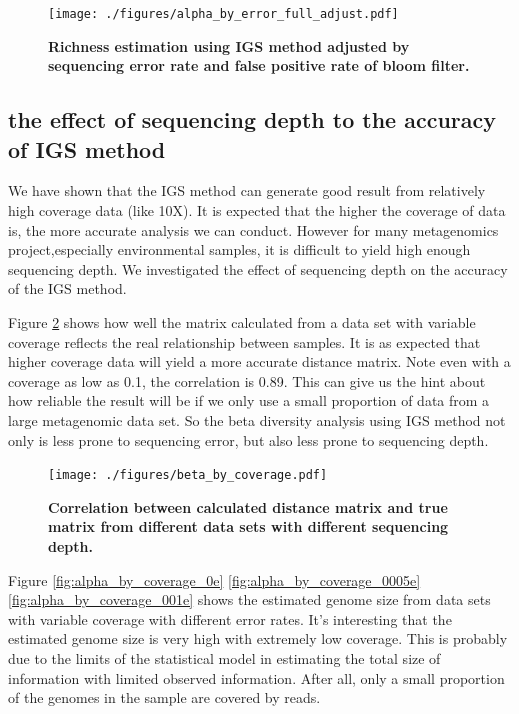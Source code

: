 \begin{figure}[!ht]
 \centerline{\texttt{[image: ./figures/alpha\_by\_error\_full\_adjust.pdf]}}
\caption{\bf Richness estimation using IGS method adjusted by sequencing error
rate and false positive rate of bloom filter.}
\label{fig:IGS_richness_adjustment}
\end{figure}


\subsection{the effect of sequencing depth to the accuracy of IGS method}


We have shown that the IGS method can generate good result from relatively
high coverage data (like 10X). It is expected that the higher the coverage
of data is, the more accurate analysis we can conduct. However for many 
metagenomics project,especially environmental samples, it is difficult
to yield high enough sequencing depth. We investigated the effect of 
sequencing depth on the accuracy of the IGS method.


Figure \ref{fig:IGS_correlation_coverage} shows how well the matrix 
calculated from a data set with variable coverage 
reflects the real relationship between samples. It is as expected that 
higher coverage data will yield a more accurate distance matrix.
Note even with a coverage as low as 0.1, the correlation is 0.89. 
This can give us the hint about how reliable the result will be if 
we only use a small proportion of data from a large metagenomic data set.
So the beta diversity analysis using IGS method not only is less prone to
sequencing error, but also less prone to sequencing depth.


\begin{figure}[!ht]
 \centerline{\texttt{[image: ./figures/beta\_by\_coverage.pdf]}}
\caption{\bf Correlation between calculated distance matrix and true matrix
from different data sets with different sequencing depth.}
\label{fig:IGS_correlation_coverage}
\end{figure}



Figure \ref{fig:alpha_by_coverage_0e} \ref{fig:alpha_by_coverage_0005e} \ref{fig:alpha_by_coverage_001e} 
shows the estimated genome size 
from data sets with variable coverage with different error rates.
It's interesting that the estimated genome size is very high with extremely low 
coverage. This is probably due to the limits of the statistical model in estimating
the total size of information with limited observed information.
After all, only a small proportion of the genomes in the sample are covered by
reads.

